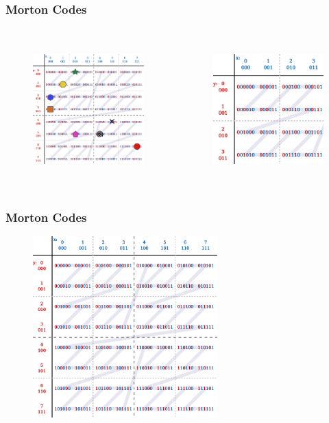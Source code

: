 \documentclass{beamer}
\begin{document}
\begin{frame}
  \frametitle{Morton Codes}
  
\begin{columns}[t]

\begin{figure}
\includegraphics[height=55mm]{Z-curve-primitives.png}
\end{figure}

\begin{figure}
\includegraphics[height=55mm]{Z-curve-zoomed.png}
\end{figure}
\end{columns}
\end{frame}

\begin{frame}
  \frametitle{Morton Codes}
\begin{figure}
\includegraphics[height=70mm]{Z-curve.png}
\end{figure}
\end{frame}
\end{document}
